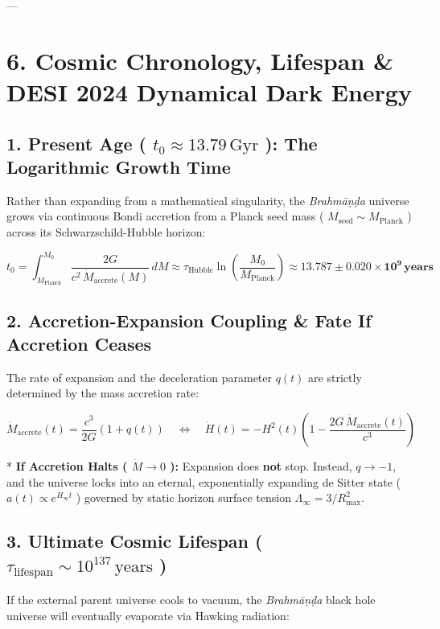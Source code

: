 \documentclass[11pt,a4paper]{article}
\theoremstyle{definition}
\theoremstyle{remark}
\begin{document}
---

\section{6. Cosmic Chronology, Lifespan \& DESI 2024 Dynamical Dark Energy}

\subsection{1. Present Age ( $t_0 \approx 13.79 \, \text{Gyr}$ ): The Logarithmic Growth Time}
Rather than expanding from a mathematical singularity, the \textit{Brahmāṇḍa} universe grows via continuous Bondi accretion from a Planck seed mass ( $M_{\text{seed}} \sim M_{\text{Planck}}$ ) across its Schwarzschild-Hubble horizon:


\begin{equation}
t_0 = \int_{M_{\text{Planck}}}^{M_0} \frac{2G}{c^2 \, \dot{M}_{\text{accrete}}(M)} \, dM \approx \tau_{\text{Hubble}} \ln\left(\frac{M_0}{M_{\text{Planck}}}\right) \approx \mathbf{13.787 \pm 0.020 \times 10^9 \, \text{years}}
\end{equation}


\subsection{2. Accretion-Expansion Coupling \& Fate If Accretion Ceases}
The rate of expansion and the deceleration parameter $q(t)$ are strictly determined by the mass accretion rate:


\begin{equation}
\boxed{\dot{M}_{\text{accrete}}(t) = \frac{c^3}{2G} (1 + q(t)) \quad \iff \quad \dot{H}(t) = -H^2(t) \left( 1 - \frac{2G \, \dot{M}_{\text{accrete}}(t)}{c^3} \right)}
\end{equation}


* \textbf{If Accretion Halts ( $\dot{M} \to 0$ ):}
Expansion does \textbf{not} stop. Instead, $q \to -1$, and the universe locks into an eternal, exponentially expanding de Sitter state ( $a(t) \propto e^{H_\infty t}$ ) governed by static horizon surface tension $\Lambda_\infty = 3 / R_{\text{max}}^2$.

\subsection{3. Ultimate Cosmic Lifespan ( $\tau_{\text{lifespan}} \sim 10^{137} \, \text{years}$ )}
If the external parent universe cools to vacuum, the \textit{Brahmāṇḍa} black hole universe will eventually evaporate via Hawking radiation:
\end{document}
